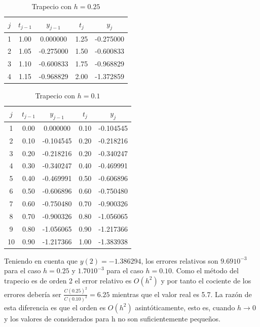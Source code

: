 \documentclass{article}
\theoremstyle{theorem-style}  %
\theoremstyle{definition-style}
\theoremstyle{example-style}
\begin{document}
	\begin{table}[H]
		\centering
		\begin{tabular}{|| c | c | c | c | c ||}
			\hline
			\hline $j$ &  $t_{j-1}$ & $y_{j-1}$ & $t_j$ & $y_j$ \\
			\hline 1 & 1.00 & 0.000000 & 1.25 & -0.275000 \\
			\hline 2 & 1.05 & -0.275000 & 1.50 & -0.600833 \\
			\hline 3 & 1.10 & -0.600833 & 1.75 & -0.968829 \\
			\hline 4 & 1.15 & -0.968829 & 2.00 & -1.372859 \\
			\hline
			\hline
		\end{tabular}
		\caption{Trapecio con $h=0.25$}
		\label{table:trapecio-ejemplo2.1}
	\end{table}

	\begin{table}[H]
		\centering
		\begin{tabular}{|| c | c | c | c | c ||}
			\hline
			\hline $j$ &  $t_{j-1}$ & $y_{j-1}$ & $t_j$ & $y_j$ \\
			\hline 1 & 0.00 & 0.000000 & 0.10 & -0.104545 \\
			\hline 2 & 0.10 & -0.104545 & 0.20 & -0.218216 \\
			\hline 3 & 0.20 & -0.218216 & 0.20 & -0.340247 \\
			\hline 4 & 0.30 & -0.340247 & 0.40 & -0.469991 \\
			\hline 5 & 0.40 & -0.469991 & 0.50 & -0.606896 \\
			\hline 6 & 0.50 & -0.606896 & 0.60 & -0.750480 \\
			\hline 7 & 0.60 & -0.750480 & 0.70 & -0.900326 \\
			\hline 8 & 0.70 & -0.900326 & 0.80 & -1.056065 \\
			\hline 9 & 0.80 & -1.056065 & 0.90 & -1.217366 \\
			\hline 10 & 0.90 & -1.217366 & 1.00 & -1.383938 \\
			\hline
			\hline
		\end{tabular}
		\caption{Trapecio con $h=0.1$}
		\label{table:trapecio-ejemplo2.2}
	\end{table}

	Teniendo en cuenta que $y(2)=-1.386294$, los errores relativos son $9.69 10^{-3}$ para el caso $h=0.25$ y $1.70 10^{-3}$ para el caso $h=0.10$. Como el método del trapecio es de orden 2 el error relativo es $O(h^2)$ y por tanto el cociente de los errores debería ser $\frac{C(0.25)^2}{C(0.10)^2}=6.25$ mientras que el valor real es 5.7. La razón de esta diferencia es que el orden es $O(h^2)$ asintóticamente, esto es, cuando $h \to 0$ y los valores de considerados para h no son suficientemente pequeños.
\end{document}
